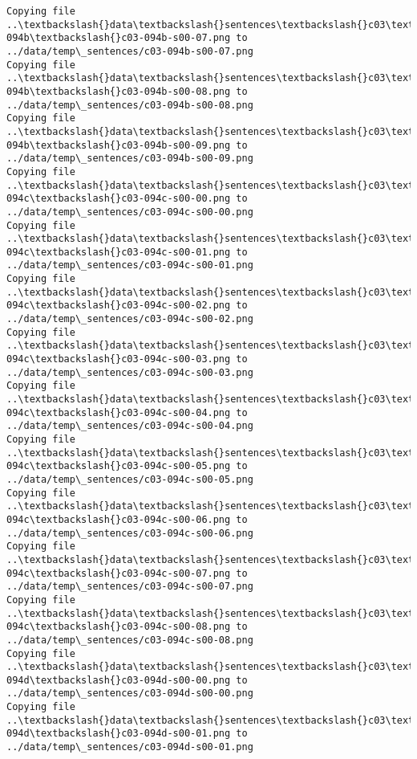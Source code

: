\documentclass[11pt]{article}
\begin{document}
\begin{Verbatim}[commandchars=\\\{\}]
Copying file ..\textbackslash{}data\textbackslash{}sentences\textbackslash{}c03\textbackslash{}c03-094b\textbackslash{}c03-094b-s00-07.png to
../data/temp\_sentences/c03-094b-s00-07.png
Copying file ..\textbackslash{}data\textbackslash{}sentences\textbackslash{}c03\textbackslash{}c03-094b\textbackslash{}c03-094b-s00-08.png to
../data/temp\_sentences/c03-094b-s00-08.png
Copying file ..\textbackslash{}data\textbackslash{}sentences\textbackslash{}c03\textbackslash{}c03-094b\textbackslash{}c03-094b-s00-09.png to
../data/temp\_sentences/c03-094b-s00-09.png
Copying file ..\textbackslash{}data\textbackslash{}sentences\textbackslash{}c03\textbackslash{}c03-094c\textbackslash{}c03-094c-s00-00.png to
../data/temp\_sentences/c03-094c-s00-00.png
Copying file ..\textbackslash{}data\textbackslash{}sentences\textbackslash{}c03\textbackslash{}c03-094c\textbackslash{}c03-094c-s00-01.png to
../data/temp\_sentences/c03-094c-s00-01.png
Copying file ..\textbackslash{}data\textbackslash{}sentences\textbackslash{}c03\textbackslash{}c03-094c\textbackslash{}c03-094c-s00-02.png to
../data/temp\_sentences/c03-094c-s00-02.png
Copying file ..\textbackslash{}data\textbackslash{}sentences\textbackslash{}c03\textbackslash{}c03-094c\textbackslash{}c03-094c-s00-03.png to
../data/temp\_sentences/c03-094c-s00-03.png
Copying file ..\textbackslash{}data\textbackslash{}sentences\textbackslash{}c03\textbackslash{}c03-094c\textbackslash{}c03-094c-s00-04.png to
../data/temp\_sentences/c03-094c-s00-04.png
Copying file ..\textbackslash{}data\textbackslash{}sentences\textbackslash{}c03\textbackslash{}c03-094c\textbackslash{}c03-094c-s00-05.png to
../data/temp\_sentences/c03-094c-s00-05.png
Copying file ..\textbackslash{}data\textbackslash{}sentences\textbackslash{}c03\textbackslash{}c03-094c\textbackslash{}c03-094c-s00-06.png to
../data/temp\_sentences/c03-094c-s00-06.png
Copying file ..\textbackslash{}data\textbackslash{}sentences\textbackslash{}c03\textbackslash{}c03-094c\textbackslash{}c03-094c-s00-07.png to
../data/temp\_sentences/c03-094c-s00-07.png
Copying file ..\textbackslash{}data\textbackslash{}sentences\textbackslash{}c03\textbackslash{}c03-094c\textbackslash{}c03-094c-s00-08.png to
../data/temp\_sentences/c03-094c-s00-08.png
Copying file ..\textbackslash{}data\textbackslash{}sentences\textbackslash{}c03\textbackslash{}c03-094d\textbackslash{}c03-094d-s00-00.png to
../data/temp\_sentences/c03-094d-s00-00.png
Copying file ..\textbackslash{}data\textbackslash{}sentences\textbackslash{}c03\textbackslash{}c03-094d\textbackslash{}c03-094d-s00-01.png to
../data/temp\_sentences/c03-094d-s00-01.png

\end{Verbatim}
\end{document}
